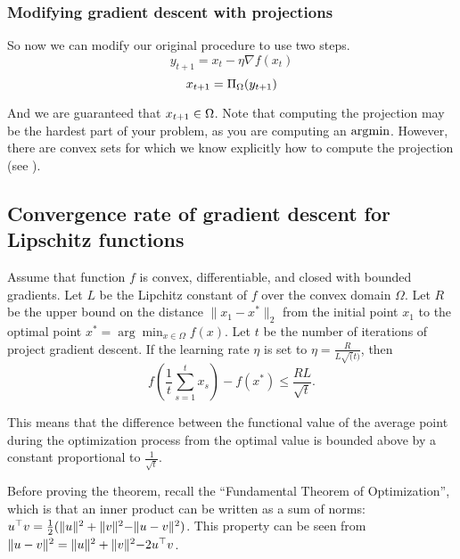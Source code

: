 \subsubsection{Modifying gradient descent with projections}

So now we can modify our original procedure to use two steps.
\[
y_{t+1} = x_t - \eta \nabla f(x_t)
\]
\[
x_{t+1} = \Pi_{\Omega}(y_{t+1})
\]

And we are guaranteed that $x_{t+1}\in\Omega$. Note that computing the
projection may be the hardest part of your problem, as you are computing an
$\operatorname*{\arg\!\min}$. However, there are convex sets for which we know explicitly how to
compute the projection (see ).

\subsection{Convergence rate of gradient descent for Lipschitz functions}

\begin{theorem}

Assume that function $f$ is convex, differentiable, and closed with bounded
gradients. Let $L$ be the Lipchitz constant of $f$ over the convex domain
$\Omega$. Let $R$ be the upper bound on the distance $\lVert x_1 - x^* \rVert_2$
from the initial point $x_1$ to the optimal point $x^* = \arg\min_{x \in \Omega} f(x)$.
Let $t$ be the number of iterations of project gradient descent.
If the learning rate $\eta$ is set to $\eta=\frac{R}{L\sqrt(t)}$,
then $$f\left(\frac{1}{t}\sum_{s=1}^t x_s\right) - f\left(x^*\right) \leq
\frac{RL}{\sqrt{t}}.$$
\end{theorem}

This means that the difference between the functional value of the average
point during the optimization process from the optimal value is bounded above
by a constant proportional to $\frac{1}{\sqrt{t}}$.

Before proving the theorem, recall the ``Fundamental Theorem of Optimization'',
which is that an inner product can be written as a sum of norms: $u^\top v =
\frac{1}{2}(\lVert u \rVert^2 + \lVert v \lVert^2 - \lVert u - v \rVert^2)$.
This property can be seen from $\lVert u - v \rVert^2 = \lVert u \rVert^2 + \lVert v \lVert^2 - 2 u^\top v$.

